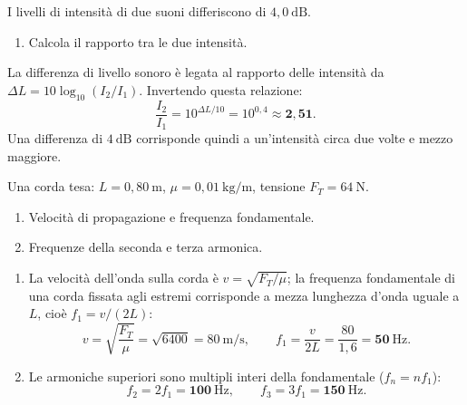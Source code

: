 \begin{question}[ID=5.6, subtitle={Rapporto tra intensità di due suoni che differiscono di 4 dB}, tags={livello sonoro, scala logaritmica}, difficulty=media]
I livelli di intensità di due suoni differiscono di $4{,}0\ \mathrm{dB}$.
\begin{enumerate}
\item Calcola il rapporto tra le due intensità.
\end{enumerate}
\begin{solution}
La differenza di livello sonoro è legata al rapporto delle intensità da $\Delta L = 10\log_{10}(I_2/I_1)$. Invertendo questa relazione:
\[
\frac{I_2}{I_1} = 10^{\Delta L/10} = 10^{0{,}4} \approx \mathbf{2{,}51}.
\]
Una differenza di $4\ \mathrm{dB}$ corrisponde quindi a un'intensità circa due volte e mezzo maggiore.
\end{solution}
\end{question}


\begin{question}[ID=6.1, subtitle={Corda tesa — frequenza fondamentale e armoniche}, tags={onde stazionarie, corda}, difficulty=media]
Una corda tesa: $L = 0{,}80\ \mathrm{m}$, $\mu = 0{,}01\ \mathrm{kg/m}$, tensione $F_T = 64\ \mathrm{N}$.
\begin{enumerate}
\item Velocità di propagazione e frequenza fondamentale.
\item Frequenze della seconda e terza armonica.
\end{enumerate}
\begin{solution}
\begin{enumerate}
\item La velocità dell'onda sulla corda è $v = \sqrt{F_T/\mu}$; la frequenza fondamentale di una corda fissata agli estremi corrisponde a mezza lunghezza d'onda uguale a $L$, cioè $f_1 = v/(2L)$:
\[
v = \sqrt{\frac{F_T}{\mu}} = \sqrt{6400} = 80\ \mathrm{m/s}, \qquad f_1 = \frac{v}{2L} = \frac{80}{1{,}6} = \mathbf{50\ \mathrm{Hz}}.
\]
\item Le armoniche superiori sono multipli interi della fondamentale ($f_n = n f_1$):
\[
f_2 = 2f_1 = \mathbf{100\ \mathrm{Hz}}, \qquad f_3 = 3f_1 = \mathbf{150\ \mathrm{Hz}}.
\]
\end{enumerate}
\end{solution}
\end{question}

